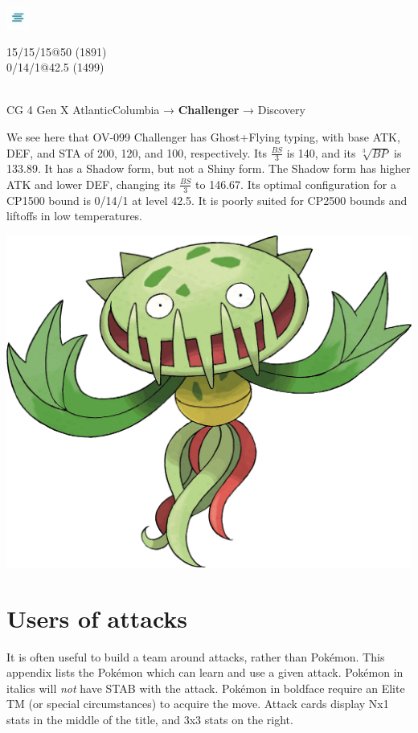 \documentclass[ebook,10pt,openany,oneside]{memoir}
\begin{document}
\begin{speciesbox}[title=OV-099 Challenger,title style={left color=Flying,right color=Ghost},after title={\hfill 200 120 100 140.00 133.89}]
\begin{minipage}{0.3\linewidth}
\includegraphics[height=2em,keepaspectratio]{images/fog.png}
\end{minipage}
\begin{minipage}{0.7\linewidth}\raggedleft{}
\vfill{}
  15/15/15@50 (1891)\\
  0/14/1@42.5 (1499)
\end{minipage}\\
CG 4 Gen X Atlantic\hfill{}Columbia → \textbf{Challenger} → Discovery
\end{speciesbox}
\bigskip\noindent{}We see here that OV-099 Challenger has Ghost+Flying typing, with base ATK, DEF, and STA
of 200, 120, and 100, respectively. Its $\frac{BS}{3}$ is 140, and its $\sqrt[3]{BP}$ is 133.89.
It has a Shadow form, but not a Shiny form. The Shadow form has higher ATK and lower DEF, changing
its $\frac{BS}{3}$ to 146.67. Its optimal configuration for a CP1500 bound is 0/14/1 at level 42.5.
It is poorly suited for CP2500 bounds and liftoffs in low temperatures.
\clearpage

\vfill\includegraphics[width=\linewidth,keepaspectratio]{images/carnivine.png}\vfill

\chapter{Users of attacks\label{chap:attackemployers}}
It is often useful to build a team around attacks, rather than Pokémon.
This appendix lists the Pokémon which can learn and use a given attack.
Pokémon in italics will \textit{not} have STAB with the attack.
Pokémon in boldface require an Elite TM (or special circumstances) to acquire the move.
Attack cards display Nx1 stats in the middle of the title, and 3x3 stats on the right.
\end{document}
